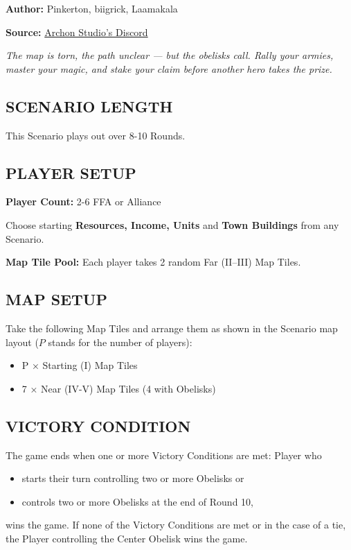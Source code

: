 
\begin{multicols*}{2}

\textbf{Author:} Pinkerton, biigrick, Laamakala

\textbf{Source:} \href{https://discord.com/channels/740870068178649108/1232319328049954826}{Archon Studio's Discord}

\textit{The map is torn, the path unclear — but the obelisks call. Rally your armies, master your magic, and stake your claim before another hero takes the prize.}  %

\subsection*{\MakeUppercase{Scenario Length}}
This Scenario plays out over 8-10 Rounds.

\subsection*{\MakeUppercase{Player Setup}}
\textbf{Player Count:} 2-6 FFA or Alliance

Choose starting \textbf{Resources, Income, Units} and \textbf{Town Buildings} from any Scenario.

\textbf{Map Tile Pool:} Each player takes 2 random Far (II--III) Map Tiles.

\subsection*{\MakeUppercase{Map Setup}}
Take the following Map Tiles and arrange them as shown in the Scenario map layout ($P$ stands for the number of players):

\begin{itemize}
  \item P × Starting (I) Map Tiles
  \item 7 × Near (IV-V) Map Tiles (4 with Obelisks)
\end{itemize}

\subsection*{\MakeUppercase{Victory Condition}}
The game ends when one or more Victory Conditions are met: Player who
\begin{itemize}
  \item starts their turn controlling two or more Obelisks or
  \item controls two or more Obelisks at the end of Round 10,
\end{itemize}
wins the game. If none of the Victory Conditions are met or in the case of a tie, the Player controlling the Center Obelisk wins the game.


\end{multicols*}
